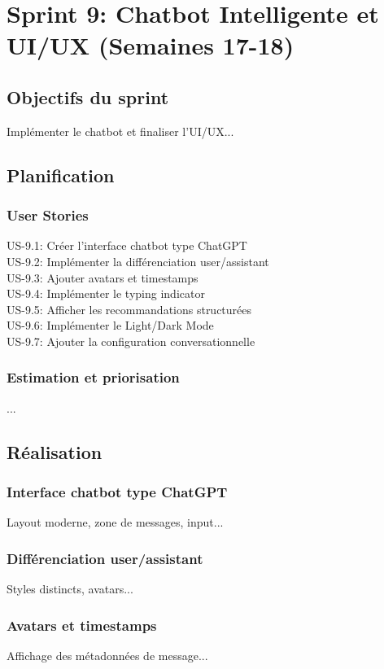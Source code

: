 \documentclass[12pt,a4paper]{report}
\begin{document}
\section{Sprint 9: Chatbot Intelligente et UI/UX (Semaines 17-18)}
\subsection{Objectifs du sprint}
Implémenter le chatbot et finaliser l'UI/UX...

\subsection{Planification}
\subsubsection{User Stories}
US-9.1: Créer l'interface chatbot type ChatGPT \\
US-9.2: Implémenter la différenciation user/assistant \\
US-9.3: Ajouter avatars et timestamps \\
US-9.4: Implémenter le typing indicator \\
US-9.5: Afficher les recommandations structurées \\
US-9.6: Implémenter le Light/Dark Mode \\
US-9.7: Ajouter la configuration conversationnelle

\subsubsection{Estimation et priorisation}
...

\subsection{Réalisation}
\subsubsection{Interface chatbot type ChatGPT}
Layout moderne, zone de messages, input...

\subsubsection{Différenciation user/assistant}
Styles distincts, avatars...

\subsubsection{Avatars et timestamps}
Affichage des métadonnées de message...
\end{document}
